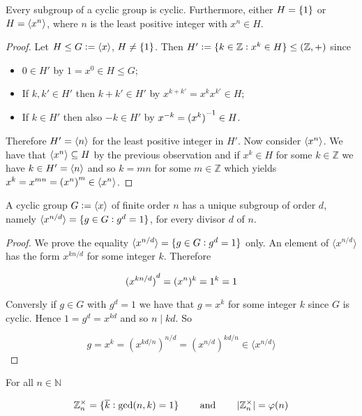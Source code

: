 \vspace{2mm}

\begin{corollary}
	Every subgroup of a cyclic group is cyclic. Furthermore, either $H = \cbr[0]{1}$ or $H = \left\langle {x^n} \right\rangle$, where $n$ is the least positive integer with $x^n \in H$.
\end{corollary}

\begin{proof}
	Let $H \leq G := \left\langle {x} \right\rangle$, $H \neq \cbr[0]{1}$. Then $H' := \cbr[0]{k \in \mathbb{Z} : x^k \in H} \leq (\mathbb{Z},+)$ since 

	\begin{itemize}
		\item $0 \in H'$ by $1 = x^0 \in H \leq G$;
		\item If $k,k' \in H'$ then $k + k' \in H'$ by $x^{k + k'} = x^kx^{k'} \in H$;
		\item If $k \in H'$ then also $-k \in H'$ by $x^{-k} = \del[0]{x^{k}}^{-1} \in H$. 
	\end{itemize}

	Therefore $H' = \left\langle {n} \right\rangle$ for the least positive integer in $H'$. Now consider $\left\langle {x^n} \right\rangle$. We have that $\left\langle {x^n} \right\rangle \subseteq H$ by the previous observation and if $x^k \in H$ for some $k \in \mathbb{Z}$ we have $k \in H' = \left\langle {n} \right\rangle$ and so $k = mn$ for some $m \in \mathbb{Z}$ which yields $x^k = x^{mn} = \del[0]{x^n}^m \in \innerprod{x^n}$.    
\end{proof}

\vspace{2mm}

\begin{proposition}
	A cyclic group $G := \left\langle {x} \right\rangle$ of finite order $n$ has a unique subgroup of order $d$, namely $\langle x^{n/d} \rangle = \cbr[0]{g \in G : g^d = 1}$, for every divisor $d$ of $n$.	
\end{proposition}

\begin{proof}
	We prove the equality $\langle x^{n/d} \rangle = \cbr[0]{g \in G : g^d = 1}$ only. An element of $\langle x^{n/d} \rangle$ has the form $x^{kn/d}$ for some integer $k$. Therefore 

	\begin{equation*}
		\del[0]{x^{kn/d}}^d = (x^n)^k = 1^k = 1
	\end{equation*}

	Conversly if $g \in G$ with $g^d = 1$ we have that $g = x^k$ for some integer $k$ since $G$ is cyclic. Hence $1 = g^d = x^{kd}$ and so $n \mid kd$. So 

	\begin{equation*}
		g = x^k = (x^{kd/n})^{n/d} = (x^{n/d})^{kd/n} \in \langle x^{n/d}\rangle
	\end{equation*}
\end{proof}

\vspace{2mm}

\begin{lemma}
	For all $n \in \mathbb{N}$

	\begin{equation*}
		\mathbb{Z}^\times_n = \cbr[0]{\overline{k} :\gcd(n,k)=1} \qquad \text{and} \qquad \abs[0]{\mathbb{Z}^\times_n} = \varphi(n)
	\end{equation*}
\end{lemma}

